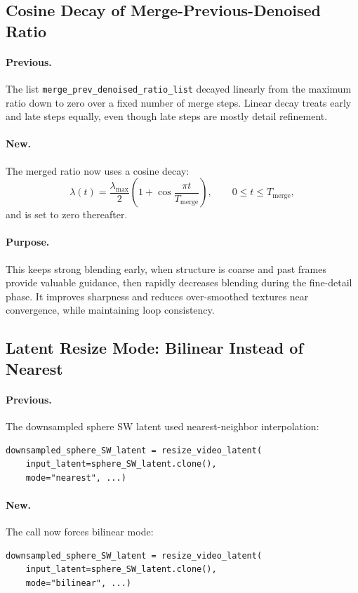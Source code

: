 \documentclass[11pt,a4paper]{article}
\newcommand{\fn}[1]{\texttt{#1}}
\begin{document}
\subsection{Cosine Decay of Merge-Previous-Denoised Ratio}

\paragraph{Previous.}
The list \fn{merge\_prev\_denoised\_ratio\_list} decayed linearly from the maximum ratio down to zero over a fixed number of merge steps.
Linear decay treats early and late steps equally, even though late steps are mostly detail refinement.

\paragraph{New.}
The merged ratio now uses a cosine decay:
\begin{equation}
    \lambda(t) = \frac{\lambda_{\max}}{2} \left(1 + \cos\frac{\pi t}{T_\text{merge}}\right),\qquad 0\le t\le T_\text{merge},
\end{equation}
and is set to zero thereafter.

\paragraph{Purpose.}
This keeps strong blending early, when structure is coarse and past frames provide valuable guidance, then rapidly decreases blending during the fine-detail phase.
It improves sharpness and reduces over-smoothed textures near convergence, while maintaining loop consistency.

\subsection{Latent Resize Mode: Bilinear Instead of Nearest}

\paragraph{Previous.}
The downsampled sphere SW latent used nearest-neighbor interpolation:
\begin{lstlisting}
downsampled_sphere_SW_latent = resize_video_latent(
    input_latent=sphere_SW_latent.clone(),
    mode="nearest", ...)
\end{lstlisting}

\paragraph{New.}
The call now forces bilinear mode:
\begin{lstlisting}
downsampled_sphere_SW_latent = resize_video_latent(
    input_latent=sphere_SW_latent.clone(),
    mode="bilinear", ...)
\end{lstlisting}
\end{document}
